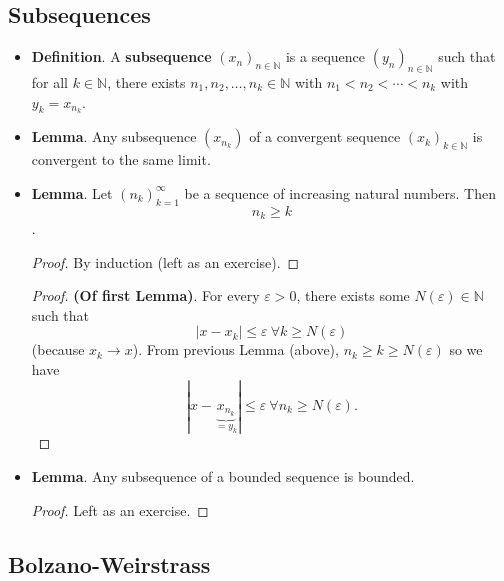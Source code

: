 \documentclass{article}
\newcommand{\N}{\mathbb{N}}
\newcommand{\seq}[2]{(#1_{#2})_{#2 \in \N}}
\newcommand{\?}{\stackrel{?}{=}}
\begin{document}
\subsection{Subsequences}

\begin{itemize}
    \item \textbf{Definition}. A \textbf{subsequence} $\seq{x}{n}$ is a sequence $\seq{y}{n}$ such that for all $k \in \N$, there exists $n_1, n_2, \ldots, n_k \in \N$ with $n_1 < n_2 < \cdots < n_k$ with $y_k = x_{n_k}$.
    \item \textbf{Lemma}. Any subsequence $(x_{n_k})$ of a convergent sequence $\seq{x}{k}$ is convergent to the same limit.
    \item \textbf{Lemma}. Let $(n_k)_{k = 1}^{\infty}$ be a sequence of increasing natural numbers. Then
    $$n_k \geq k$$.
    \begin{proof}
        By induction (left as an exercise).
    \end{proof}
    \begin{proof}
        \textbf{(Of first Lemma)}. For every $\varepsilon > 0$, there exists some $N(\varepsilon) \in \N$ such that
        $$|x - x_k| \leq \varepsilon \ \forall k \geq N(\varepsilon)$$
        (because $x_k \rightarrow x$). From previous Lemma (above), $n_k \geq k \geq N(\varepsilon)$ so we have
        $$|x - \underbrace{x_{n_k}}_{ = y_k}| \leq \varepsilon \ \forall n_k \geq N(\varepsilon).$$
    \end{proof}
    \item \textbf{Lemma}. Any subsequence of a bounded sequence is bounded.
    \begin{proof}
        Left as an exercise.
    \end{proof}
\end{itemize}

\subsection{Bolzano-Weirstrass}
\end{document}
